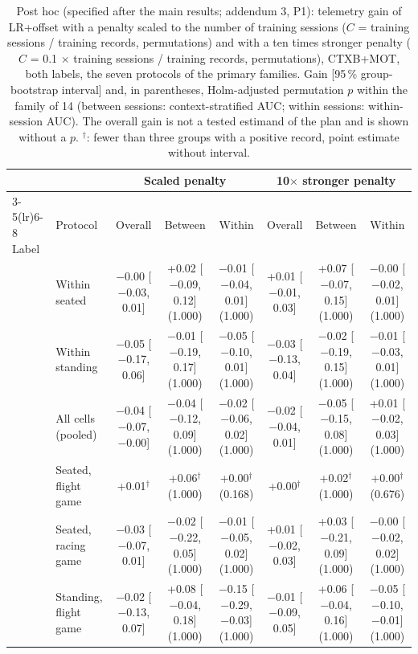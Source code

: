 \begin{table}[ht]
\centering
\scriptsize
\caption{Post hoc (specified after the main results; addendum 3, P1): telemetry gain of LR+offset with a penalty scaled to the number of training sessions ($C$ = training sessions / training records,  permutations) and with a ten times stronger penalty ($C$ = 0.1 $\times$ training sessions / training records,  permutations), CTXB+MOT, both labels, the seven protocols of the primary families. Gain [95\,\% group-bootstrap interval] and, in parentheses, Holm-adjusted permutation $p$ within the family of 14 (between sessions: context-stratified AUC; within sessions: within-session AUC). The overall gain is not a tested estimand of the plan and is shown without a $p$. $^\dagger$: fewer than three groups with a positive record, point estimate without interval.}
\label{tab:a3_p1}
\setlength{\tabcolsep}{2pt}
\begin{tabular}{@{}llcccccc@{}}
\toprule
 & & \multicolumn{3}{c}{Scaled penalty} & \multicolumn{3}{c}{10$\times$ stronger penalty} \\
\cmidrule(lr){3-5}\cmidrule(lr){6-8}
Label & Protocol & Overall & Between & Within & Overall & Between & Within \\
\midrule
\sevtwo{} & Within seated & $-$0.00 [$-$0.03, 0.01] & +0.02 [$-$0.09, 0.12] (1.000) & $-$0.01 [$-$0.04, 0.01] (1.000) & +0.01 [$-$0.01, 0.03] & +0.07 [$-$0.07, 0.15] (1.000) & $-$0.00 [$-$0.02, 0.01] (1.000) \\
 & Within standing & $-$0.05 [$-$0.17, 0.06] & $-$0.01 [$-$0.19, 0.17] (1.000) & $-$0.05 [$-$0.10, 0.01] (1.000) & $-$0.03 [$-$0.13, 0.04] & $-$0.02 [$-$0.19, 0.15] (1.000) & $-$0.01 [$-$0.03, 0.01] (1.000) \\
 & All cells (pooled) & $-$0.04 [$-$0.07, $-$0.00] & $-$0.04 [$-$0.12, 0.09] (1.000) & $-$0.02 [$-$0.06, 0.02] (1.000) & $-$0.02 [$-$0.04, 0.01] & $-$0.05 [$-$0.15, 0.08] (1.000) & +0.01 [$-$0.02, 0.03] (1.000) \\
 & Seated, flight game & +0.01$^\dagger$ & +0.06$^\dagger$ (1.000) & +0.00$^\dagger$ (0.168) & +0.00$^\dagger$ & +0.02$^\dagger$ (1.000) & +0.00$^\dagger$ (0.676) \\
 & Seated, racing game & $-$0.03 [$-$0.07, 0.01] & $-$0.02 [$-$0.22, 0.05] (1.000) & $-$0.01 [$-$0.05, 0.02] (1.000) & +0.01 [$-$0.02, 0.03] & +0.03 [$-$0.21, 0.09] (1.000) & $-$0.00 [$-$0.02, 0.02] (1.000) \\
 & Standing, flight game & $-$0.02 [$-$0.13, 0.07] & +0.08 [$-$0.04, 0.18] (1.000) & $-$0.15 [$-$0.29, $-$0.03] (1.000) & $-$0.01 [$-$0.09, 0.05] & +0.06 [$-$0.04, 0.16] (1.000) & $-$0.05 [$-$0.10, $-$0.01] (1.000) \\

\end{tabular}
\end{table}
